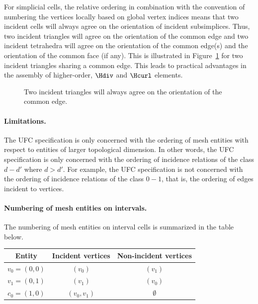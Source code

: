 For simplicial cells, the relative ordering in combination with the
convention of numbering the vertices locally based on global vertex
indices means that two incident cells will always agree on the
orientation of incident subsimplices. Thus, two incident triangles
will agree on the orientation of the common edge and two incident
tetrahedra will agree on the orientation of the common edge(s) and the
orientation of the common face (if any). This is illustrated in
Figure~\ref{fig:orientation_example_triangles} for two incident
triangles sharing a common edge. This leads to practical advantages in
the assembly of higher-order, $\Hdiv$ and $\Hcurl$ elements.

\begin{figure}
\bwfig
  \begin{center}
    \caption{Two incident triangles will always agree on the
      orientation of the common edge.}
    \label{fig:orientation_example_triangles}
  \end{center}
\end{figure}

\paragraph{Limitations.}

The UFC specification is only concerned with the ordering of mesh
entities with respect to entities of larger topological dimension. In
other words, the UFC specification is only concerned with the ordering
of incidence relations of the class $d - d'$ where $d > d'$. For
example, the UFC specification is not concerned with the ordering of
incidence relations of the class $0 - 1$, that is, the ordering of
edges incident to vertices.

\paragraph{Numbering of mesh entities on intervals.}

The numbering of mesh entities on interval cells is summarized in the
table below.

\begin{center}
  \begin{tabular}{ccc}
    \toprule
    Entity & Incident vertices & Non-incident vertices \\
    \hline
    $v_0 = (0, 0)$ & $(v_0)$ & $(v_1)$ \\
    $v_1 = (0, 1)$ & $(v_1)$ & $(v_0)$ \\
    $c_0 = (1, 0)$ & $(v_0, v_1)$ & $\emptyset$ \\
    \bottomrule
  \end{tabular}
\end{center}

